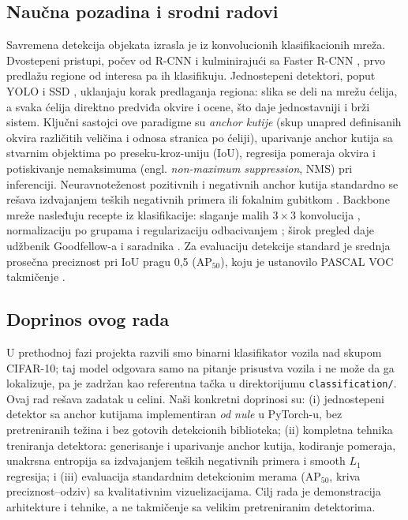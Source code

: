 \documentclass[11pt,a4paper]{article}
\begin{document}
\subsection{Naučna pozadina i srodni radovi}

Savremena detekcija objekata izrasla je iz konvolucionih klasifikacionih mreža.
Dvostepeni pristupi, počev od R-CNN \cite{girshick2014rcnn} i kulminirajući
sa Faster R-CNN \cite{ren2015faster}, prvo predlažu regione od interesa pa ih
klasifikuju. Jednostepeni detektori, poput YOLO \cite{redmon2016yolo} i SSD
\cite{liu2016ssd}, uklanjaju korak predlaganja regiona: slika se deli na
mrežu ćelija, a svaka ćelija direktno predviđa okvire i ocene, što
daje jednostavniji i brži sistem. Ključni sastojci ove paradigme su
\emph{anchor kutije} (skup unapred definisanih okvira različitih veličina i
odnosa stranica po ćeliji), uparivanje anchor kutija sa stvarnim objektima po
preseku-kroz-uniju (IoU), regresija pomeraja okvira i potiskivanje nemaksimuma
(engl. \emph{non-maximum suppression}, NMS) pri inferenciji. Neuravnoteženost
pozitivnih i negativnih anchor kutija standardno se rešava izdvajanjem
teških negativnih primera \cite{liu2016ssd} ili fokalnim gubitkom
\cite{lin2017focal}. Backbone mreže nasleđuju recepte iz klasifikacije:
slaganje malih $3\times3$ konvolucija \cite{simonyan2015vgg}, normalizaciju po
grupama \cite{ioffe2015batchnorm} i regularizaciju odbacivanjem
\cite{srivastava2014dropout}; širok pregled daje udžbenik Goodfellow-a i
saradnika \cite{goodfellow2016deep}. Za evaluaciju detekcije standard je
srednja prosečna preciznost pri IoU pragu 0,5 ($\mathrm{AP}_{50}$), koju je
ustanovilo PASCAL VOC takmičenje \cite{everingham2010voc}.

\subsection{Doprinos ovog rada}

U prethodnoj fazi projekta razvili smo binarni klasifikator vozila nad skupom
CIFAR-10; taj model odgovara samo na pitanje prisustva vozila i ne može da
ga lokalizuje, pa je zadržan kao referentna tačka u direktorijumu
\texttt{classification/}. Ovaj rad rešava zadatak u celini. Naši konkretni
doprinosi su: (i) jednostepeni detektor sa anchor kutijama implementiran
\emph{od nule} u PyTorch-u, bez pretreniranih težina i bez gotovih detekcionih
biblioteka; (ii) kompletna tehnika treniranja detektora: generisanje i
uparivanje anchor kutija, kodiranje pomeraja, unakrsna entropija sa izdvajanjem
teških negativnih primera i smooth $L_1$ regresija; i (iii) evaluacija
standardnim detekcionim merama ($\mathrm{AP}_{50}$, kriva preciznost--odziv) sa
kvalitativnim vizuelizacijama. Cilj rada je demonstracija arhitekture i tehnike,
a ne takmičenje sa velikim pretreniranim detektorima.
\end{document}
